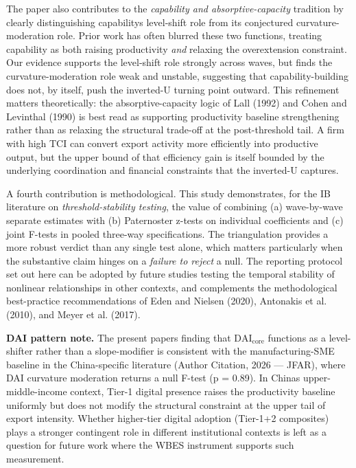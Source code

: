 \documentclass[12pt,a4paper]{article}
\begin{document}
The paper also contributes to the \emph{capability and
absorptive-capacity} tradition by clearly distinguishing
capability\textquotesingle s level-shift role from its conjectured
curvature-moderation role. Prior work has often blurred these two
functions, treating capability as both raising productivity \emph{and}
relaxing the overextension constraint. Our evidence supports the
level-shift role strongly across waves, but finds the
curvature-moderation role weak and unstable, suggesting that
capability-building does not, by itself, push the inverted-U turning
point outward. This refinement matters theoretically: the
absorptive-capacity logic of Lall (1992) and Cohen and Levinthal (1990)
is best read as supporting productivity baseline strengthening rather
than as relaxing the structural trade-off at the post-threshold tail. A
firm with high TCI can convert export activity more efficiently into
productive output, but the upper bound of that efficiency gain is itself
bounded by the underlying coordination and financial constraints that
the inverted-U captures.

A fourth contribution is methodological. This study demonstrates, for
the IB literature on \emph{threshold-stability testing}, the value of
combining (a) wave-by-wave separate estimates with (b) Paternoster
z-tests on individual coefficients and (c) joint F-tests in pooled
three-way specifications. The triangulation provides a more robust
verdict than any single test alone, which matters particularly when the
substantive claim hinges on a \emph{failure to reject} a null. The
reporting protocol set out here can be adopted by future studies testing
the temporal stability of nonlinear relationships in other contexts, and
complements the methodological best-practice recommendations of Eden and
Nielsen (2020), Antonakis et al. (2010), and Meyer et al. (2017).

\textbf{DAI pattern note.} The present paper\textquotesingle s finding
that \(\mathrm{DAI}_{\text{core}}\) functions as a level-shifter rather
than a slope-modifier is consistent with the manufacturing-SME baseline
in the China-specific literature (Author Citation, 2026 --- JFAR), where
DAI curvature moderation returns a null F-test (p = 0.89). In
China\textquotesingle s upper-middle-income context, Tier-1 digital
presence raises the productivity baseline uniformly but does not modify
the structural constraint at the upper tail of export intensity. Whether
higher-tier digital adoption (Tier-1+2 composites) plays a stronger
contingent role in different institutional contexts is left as a
question for future work where the WBES instrument supports such
measurement.
\end{document}
